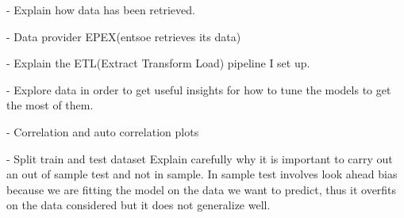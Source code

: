 - Explain how data has been retrieved.

- Data provider EPEX(entsoe retrieves its data)

- Explain the ETL(Extract Transform Load) pipeline
I set up.

- Explore data in order to get useful insights for
how to tune the models to get the most of them.

- Correlation and auto correlation plots

- Split train and test dataset
Explain carefully why it is important to carry
out an out of sample test and not in sample.
In sample test involves look ahead bias because we are
fitting the model on the data we want to predict,
thus it overfits on the data considered but it does
not generalize well.
